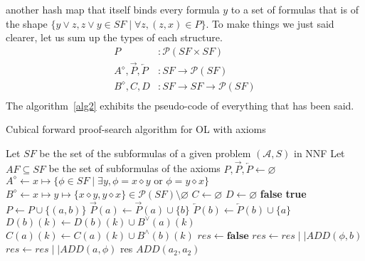 \documentclass[a4paper, 11pt]{article}
\begin{document}
    another hash map that itself binds every formula $y$ to a set of formulas that is of the shape
    $\{y\vee z,z\vee y\in SF\mid\forall z,(z,x)\in P\}$. To make things we just said clearer, let us sum 
    up the types of each structure.
    \begin{align*}
	    P&:\mathcal{P}(SF\times SF)\\
	    A^\diamond,\overrightarrow{P},\overleftarrow{P}&:SF\rightarrow\mathcal{P}(SF)\\
	    B^\diamond,C,D&:SF\rightarrow SF\rightarrow\mathcal{P}(SF)\\
    \end{align*}
    The algorithm~\ref{alg2} exhibits the pseudo-code of everything that has been said.
    \begin{algorithm}
	    \caption{Cubical forward proof-search algorithm for OL with axioms}
	    \label{alg2}
	    \begin{algorithmic}
		\State Let $SF$ be the set of the subformulas of a given problem $(\mathcal{A},S)$ in NNF
		\State Let $AF\subseteq SF$ be the set of subformulas of the axioms
		    \State $P,\overrightarrow{P},\overleftarrow{P}\gets\varnothing$
		    \State $A^\diamond\gets x\mapsto\{\phi\in SF\mid\exists y,\phi=x\diamond y\text{ or }
		    \phi=y\diamond x\}$
		    \State $B^\diamond\gets x\mapsto y\mapsto \{x\diamond y,y\diamond x\}\in
		    \mathcal{P}(SF)\setminus\varnothing$
		\State $C\gets\varnothing$
		\State $D\gets\varnothing$
			\State\Return\textbf{false}
			\EndIf
			\State \Return \textbf{true}
			\EndIf
			\State $P\gets P\cup\{(a,b)\}$
			\State $\overrightarrow{P}(a)\gets\overrightarrow{P}(a)\cup\{b\}$
			\State $\overleftarrow{P}(b)\gets\overleftarrow{P}(b)\cup\{a\}$
			\State $D(b)(k)\gets D(b)(k)\cup B^\vee(a)(k)$
			\EndFor
			\State $C(a)(k)\gets C(a)(k)\cup B^\wedge(b)(k)$
			\EndFor	
			\State $res\gets \textbf{false}$
			\State $res\gets res\mid\mid ADD(\phi,b)$
			\EndFor
			\State $res\gets res\mid\mid ADD(a,\phi)$
			\EndFor
			\State \Return res
		\EndProcedure
		    \State $ADD(a_2,a_2)$
		    \EndFor
	    \end{algorithmic}
    \end{algorithm}
\end{document}
